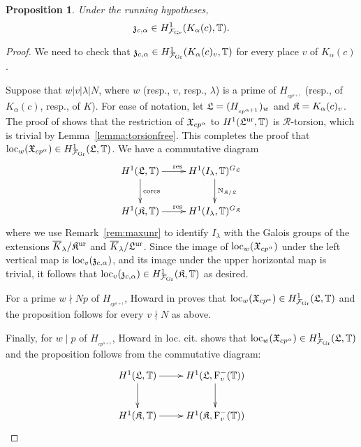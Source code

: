 \documentclass[12pt]{amsart}
\numberwithin{equation}{section}
\newtheorem{prop}[thm]{Proposition}
\begin{document}
\begin{prop}
\label{prop:localbigEuler} Under the running hypotheses,
$$\frak{z}_{c,\alpha}\in H^1_{{\mathcal{F}}_{\textup{Gr}}}(K_\alpha(c),{\mathbb{T}}).$$
\end{prop}
\begin{proof}
We need to check that $\frak{z}_{c,\alpha}\in H^1_{{\mathcal{F}}_{\textup{Gr}}}(K_\alpha(c)_v,{\mathbb{T}})$ for every place $v$ of $K_\alpha(c)$.

Suppose that $w| v| \lambda|N$, where $w$ (resp., $v$, resp., $\lambda$) is a prime of $H_{_{cp^{\alpha+1}}}$ (resp., of $K_\alpha(c)$, resp., of $K$). For ease of notation, let $\frak{L}=(H_{_{cp^{\alpha+1}}})_w$ and $\frak{K}=K_\alpha(c)_v$. The proof of \cite[Prop. 2.4.5]{howard} shows that the restriction of $\frak{X}_{cp^{\alpha}}$ to $H^1(\frak{L}^{\textup{ur}},{\mathbb{T}})$ is ${\mathcal{R}}$-torsion, which is trivial by Lemma~\ref{lemma:torsionfree}. This completes the proof that  $\textup{loc}_w(\frak{X}_{cp^{\alpha}}) \in H^1_{{\mathcal{F}}_{\textup{Gr}}}(\frak{L},{\mathbb{T}})$. We have a commutative diagram
$$\xymatrix{
H^1(\frak{L},{\mathbb{T}})\ar[r]^{\textup{res}}\ar[d]^{\textup{cores}} &H^1(I_\lambda,{\mathbb{T}})^{G_{\frak{L}}}\ar[d]^{\textup{N}_{\frak{K}/\frak{L}}} \\
H^1(\frak{K},{\mathbb{T}})\ar[r]^{\textup{res}}& H^1(I_\lambda,{\mathbb{T}})^{G_\frak{K}}
}$$
where we use Remark~\ref{rem:maxunr} to identify $I_\lambda$ with the Galois groups of the extensions $\overline{K}_\lambda/\frak{K}^{\textup{ur}}$ and $\overline{K}_\lambda/\frak{L}^{\textup{ur}}$. Since
the image of $\textup{loc}_w(\frak{X}_{cp^{\alpha}})$ under the left vertical map is $\textup{loc}_v(\frak{z}_{c, {\alpha}})$, and  its image under the upper horizontal map is trivial, it follows that $\textup{loc}_v(\frak{z}_{c, {\alpha}}) \in  H^1_{{\mathcal{F}}_{\textup{Gr}}}(\frak{K},{\mathbb{T}})$ as desired.

For a prime $w\nmid Np$  of $H_{_{cp^{\alpha+1}}}$, Howard in \cite[Prop. 2.4.5]{howard} proves that $\textup{loc}_w(\frak{X}_{cp^{\alpha}}) \in H^1_{{\mathcal{F}}_{\textup{Gr}}}(\frak{L},{\mathbb{T}})$ and the proposition follows for every $v\nmid N$ as above.

Finally, for $w\mid p$ of $H_{_{cp^{\alpha+1}}}$, Howard in loc. cit. shows that $\textup{loc}_w(\frak{X}_{cp^{\alpha}}) \in H^1_{{\mathcal{F}}_{\textup{Gr}}}(\frak{L},{\mathbb{T}})$ and the proposition follows from the commutative diagram:
$$\xymatrix{
H^1(\frak{L},{\mathbb{T}})\ar[r]\ar[d] &H^1(\frak{L},\textup{F}_v^-({\mathbb{T}}))\ar[d]\\
H^1(\frak{K},{\mathbb{T}})\ar[r]& H^1(\frak{K},\textup{F}_v^-({\mathbb{T}}))
}$$
\end{proof}
\end{document}
